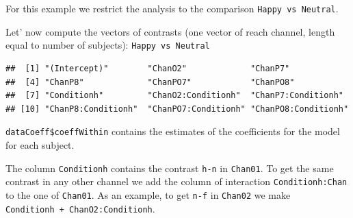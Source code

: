 \documentclass[
]{article}
\newenvironment{Shaded}{\begin{snugshade}}{\end{snugshade}}
\newcommand{\AttributeTok}[1]{\textcolor[rgb]{0.77,0.63,0.00}{#1}}
\newcommand{\ConstantTok}[1]{\textcolor[rgb]{0.00,0.00,0.00}{#1}}
\newcommand{\FunctionTok}[1]{\textcolor[rgb]{0.00,0.00,0.00}{#1}}
\newcommand{\NormalTok}[1]{#1}
\newcommand{\OtherTok}[1]{\textcolor[rgb]{0.56,0.35,0.01}{#1}}
\newcommand{\SpecialCharTok}[1]{\textcolor[rgb]{0.00,0.00,0.00}{#1}}
\newcommand{\StringTok}[1]{\textcolor[rgb]{0.31,0.60,0.02}{#1}}
\begin{document}
For this example we restrict the analysis to the comparison
\texttt{Happy\ vs\ Neutral}.

Let' now compute the vectors of contrasts (one vector of reach channel,
length equal to number of subjects): \texttt{Happy\ vs\ Neutral}

\begin{Shaded}
\end{Shaded}

\begin{verbatim}
##  [1] "(Intercept)"        "ChanO2"             "ChanP7"            
##  [4] "ChanP8"             "ChanPO7"            "ChanPO8"           
##  [7] "Conditionh"         "ChanO2:Conditionh"  "ChanP7:Conditionh" 
## [10] "ChanP8:Conditionh"  "ChanPO7:Conditionh" "ChanPO8:Conditionh"
\end{verbatim}

\texttt{dataCoeff\$coeffWithin} contains the estimates of the
coefficients for the model for each subject.

The column \texttt{Conditionh} contains the contrast \texttt{h-n} in
\texttt{Chan01}. To get the same contrast in any other channel we add
the column of interaction \texttt{Conditionh:Chan} to the one of
\texttt{Chan01}. As an example, to get \texttt{n-f} in \texttt{Chan02}
we make \texttt{Conditionh\ +\ ChanO2:Conditionh}.
\end{document}
